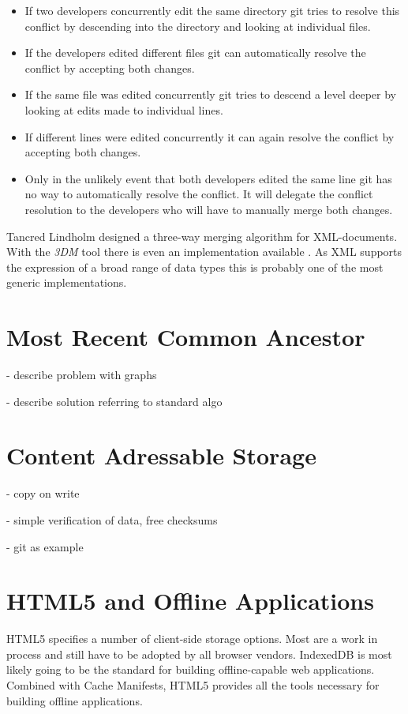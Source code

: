 \begin{itemize}
\item If two developers concurrently edit the same directory git tries to resolve this conflict by descending into the directory and looking at individual files.
\item If the developers edited different files git can automatically resolve the conflict by accepting both changes.
\item If the same file was edited concurrently git tries to descend a level deeper by looking at edits made to individual lines.
\item If different lines were edited concurrently it can again resolve the conflict by accepting both changes.
\item Only in the unlikely event that both developers edited the same line git has no way to automatically resolve the conflict.
It will delegate the conflict resolution to the developers who will have to manually merge both changes.
\end{itemize}

Tancred Lindholm designed a three-way merging algorithm for XML-documents.
With the \emph{3DM} tool there is even an implementation available \cite{Lindholm:2001uv}.
As XML supports the expression of a broad range of data types this is probably one of the most generic implementations.

\section{Most Recent Common Ancestor}
\label{background.mrca}
- describe problem with graphs

- describe solution referring to standard algo

\section{Content Adressable Storage}
- copy on write

- simple verification of data, free checksums

- git as example

\section{HTML5 and Offline Applications}
HTML5 specifies a number of client-side storage options. Most are a work in process and still have to be adopted by all browser vendors. IndexedDB is most likely going to be the standard for building offline-capable web applications. Combined with Cache Manifests, HTML5 provides all the tools necessary for building offline applications.

